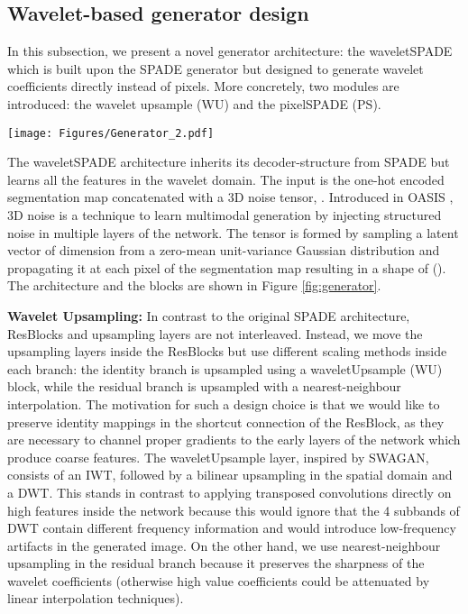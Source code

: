 \documentclass{article}
\begin{document}
 \vspace{-1em}
\subsection{Wavelet-based generator design}
In this subsection, we present a novel generator architecture: the waveletSPADE which is built upon the SPADE generator but designed to generate wavelet coefficients directly instead of pixels. More concretely, two modules are introduced: the wavelet upsample (WU) and the pixelSPADE (PS).
\begin{figure*}[t]
    \centering
    \begin{minipage}{\textwidth}
    \texttt{[image: Figures/Generator\_2.pdf]}
    \end{minipage}
    \caption{The proposed waveletSPADE generator architecture (a) builds upon the OASIS generator \cite{schonfeld2021you} by replacing the ResBlocks with the depicted waveletResBlock (b) which encompasses the novel pixelSPADE (c) as well as the WU blocks (d). The number of channels per layer is shown in each waveletResBlock. }
    \label{fig:generator}
    \vspace{-1em}
\end{figure*} The waveletSPADE architecture inherits its decoder-structure from SPADE but learns all the features in the wavelet domain. The input is the one-hot encoded segmentation map  concatenated with a 3D noise tensor, . Introduced in OASIS \cite{alharbi2020disentangled, schonfeld2021you}, 3D noise is a technique to learn multimodal generation by injecting structured noise in multiple layers of the network. The tensor is formed by sampling a latent vector of dimension  from a zero-mean unit-variance Gaussian distribution and propagating it at each pixel of the segmentation map resulting in a shape of (). The architecture and the blocks are shown in Figure \ref{fig:generator}.

{\bf Wavelet Upsampling: } In contrast to the original SPADE architecture, ResBlocks and upsampling layers are not interleaved. Instead, we move the upsampling layers inside the ResBlocks but use different scaling methods inside each branch: the identity branch is upsampled using a waveletUpsample (WU) block, while the residual branch is upsampled with a nearest-neighbour interpolation. The motivation for such a design choice is that we would like to preserve identity mappings in the shortcut connection of the ResBlock, as they are necessary to channel proper gradients to the early layers of the network which produce coarse features. The waveletUpsample layer, inspired by SWAGAN\cite{Gal2021SWAGANAS}, consists of an IWT, followed by a bilinear upsampling in the spatial domain and a DWT. This stands in contrast to applying transposed convolutions directly on high features inside the network because this would ignore that the 4 subbands of DWT contain different frequency information and would introduce low-frequency artifacts in the generated image. On the other hand, we use nearest-neighbour upsampling in the residual branch because it preserves the sharpness of the wavelet coefficients (otherwise high value coefficients could be attenuated by linear interpolation techniques).
\end{document}
